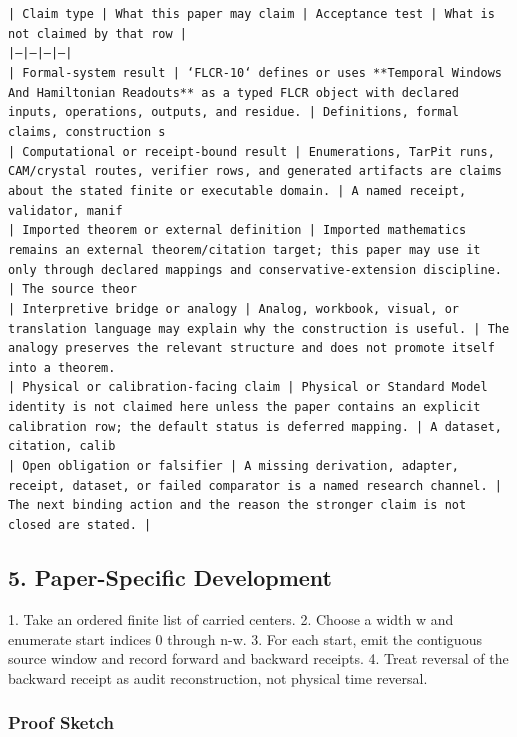 \documentclass[11pt]{article}
\begin{document}
\noindent\texttt{| Claim type | What this paper may claim | Acceptance test | What is not claimed by that row |}\\
\noindent\texttt{|---|---|---|---|}\\
\noindent\texttt{| Formal-system result | `FLCR-10` defines or uses **Temporal Windows And Hamiltonian Readouts** as a typed FLCR object with declared inputs, operations, outputs, and residue. | Definitions, formal claims, construction s}\\
\noindent\texttt{| Computational or receipt-bound result | Enumerations, TarPit runs, CAM/crystal routes, verifier rows, and generated artifacts are claims about the stated finite or executable domain. | A named receipt, validator, manif}\\
\noindent\texttt{| Imported theorem or external definition | Imported mathematics remains an external theorem/citation target; this paper may use it only through declared mappings and conservative-extension discipline. | The source theor}\\
\noindent\texttt{| Interpretive bridge or analogy | Analog, workbook, visual, or translation language may explain why the construction is useful. | The analogy preserves the relevant structure and does not promote itself into a theorem. }\\
\noindent\texttt{| Physical or calibration-facing claim | Physical or Standard Model identity is not claimed here unless the paper contains an explicit calibration row; the default status is deferred mapping. | A dataset, citation, calib}\\
\noindent\texttt{| Open obligation or falsifier | A missing derivation, adapter, receipt, dataset, or failed comparator is a named research channel. | The next binding action and the reason the stronger claim is not closed are stated. | }\\

\subsection*{5. Paper-Specific Development}

1. Take an ordered finite list of carried centers.
2. Choose a width w and enumerate start indices 0 through n-w.
3. For each start, emit the contiguous source window and record forward and backward receipts.
4. Treat reversal of the backward receipt as audit reconstruction, not physical time reversal.

\subsubsection*{Proof Sketch}
\end{document}
